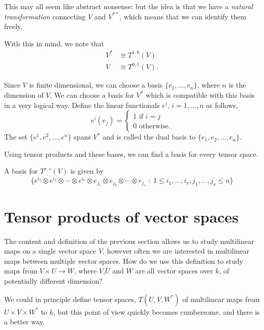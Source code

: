 \documentclass{owmaths}
\begin{document}
This may all seem like abstract nonsense: but the idea is that we have a \emph{natural transformation}
connecting $V$ and $V^{**}$, which means that we can identify them freely.

With this in mind, we note that
\begin{align*}
    V^* &\cong T^{1,0}(V)\\
    V   &\cong T^{0,1}(V).
\end{align*}

Since $V$ is finite dimensional, we can choose a basis $\{e_1,\ldots,e_n\}$,
where $n$ is the dimension of $V$. We can choose a basis for $V^*$ which is compatible
with this basis in a very logical way. Define the linear functionals $e^{i}$, $i = 1,\ldots,n$
as follows,
\begin{equation*}
    e^{i}(e_j) = \begin{cases}
        1\text{ if }i = j\\
        0\text{ otherwise.}
    \end{cases}
\end{equation*}
The set $\{e^1,e^2,\ldots,e^n\}$ spans $V^*$ and is called the dual basis to $\{e_1,e_2,\ldots,e_n\}$.

Using tensor products and these bases, we can find a basis for every tensor space.

\begin{proposition}
    A basis for $T^{r,s}(V)$ is given by
    \begin{equation*}
        \{ e^{i_1}\otimes e^{i_2}\otimes\cdots\otimes e^{i_r} \otimes e_{j_1}\otimes e_{j_2} \otimes \cdots\otimes e_{j_s}\;:\; 1\leq  i_1,\ldots,i_r,j_1,\ldots,j_s \leq n\}
    \end{equation*}
\end{proposition}

\section{Tensor products of vector spaces}
The content and definition of the previous section allows us to study
multilinear maps on a single vector space $V$, however
often we are interested in multilinear maps between multiple vector spaces. How 
do we use this definition to study maps from $V\times U \rightarrow W$, where $V$,$U$
and $W$ are all vector spaces over $k$, of potentially different dimension?

We could in principle define tensor spaces, $T(U,V,W^*)$ of multilinear maps
from $U\times V\times W^*$ to $k$, but this point of view quickly becomes cumbersome,
and there is a better way.
\end{document}
